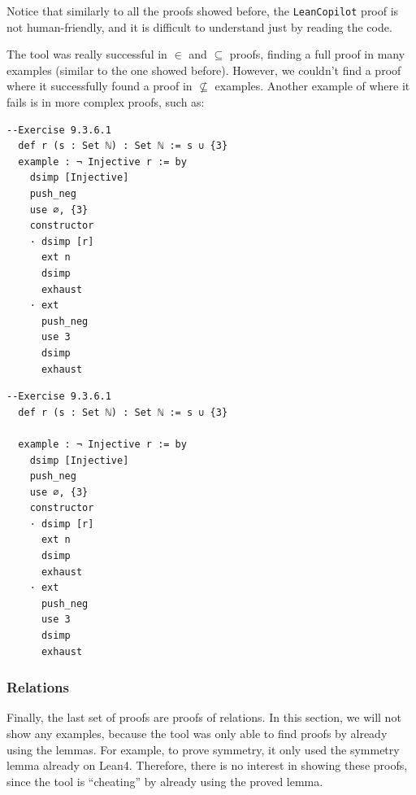 \documentclass[12pt]{article}
\newcommand{\leancopilot}{\texttt{LeanCopilot} }
\begin{document}
Notice that similarly to all the proofs showed before, the \leancopilot proof is not human-friendly, and it is difficult to understand just by reading the code. 

The tool was really successful in $\in$ and $\subseteq$ proofs, finding a full proof in many examples (similar to the one showed before). However, we couldn't find a proof where it successfully found a proof in $\nsubseteq$ examples. Another example of where it fails is in more complex proofs, such as:

\begin{minipage}{0.495\textwidth}
  \begin{lstlisting}[title={Human proof}]
  --Exercise 9.3.6.1
  def r (s : Set ℕ) : Set ℕ := s ∪ {3} 
  example : ¬ Injective r := by
    dsimp [Injective]
    push_neg
    use ∅, {3}
    constructor
    · dsimp [r]
      ext n
      dsimp
      exhaust
    · ext
      push_neg
      use 3
      dsimp
      exhaust
  \end{lstlisting}
\end{minipage}
\vline
\begin{minipage}{0.495\textwidth}
  \begin{lstlisting}[title={\leancopilot proof}]
  --Exercise 9.3.6.1
  def r (s : Set ℕ) : Set ℕ := s ∪ {3}
  
  example : ¬ Injective r := by
    dsimp [Injective]
    push_neg
    use ∅, {3}
    constructor
    · dsimp [r]
      ext n
      dsimp
      exhaust
    · ext
      push_neg
      use 3
      dsimp
      exhaust
  \end{lstlisting}
\end{minipage}


\subsubsection{Relations}
Finally, the last set of proofs are proofs of relations. In this section, we will not show any examples, because the tool was only able to find proofs by already using the lemmas. For example, to prove symmetry, it only used the symmetry lemma already on Lean4. Therefore, there is no interest in showing these proofs, since the tool is ``cheating'' by already using the proved lemma.
\end{document}
